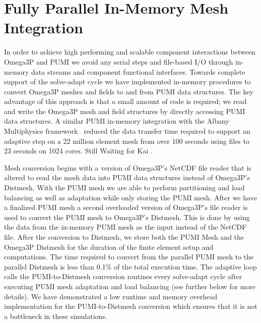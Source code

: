 \documentclass[review,12pt]{elsarticle_summary_report}
\begin{document}
\section{\label{in_memory}Fully Parallel In-Memory Mesh Integration}
In order to achieve high performing and scalable component interactions between
Omega3P and PUMI we avoid any serial steps and file-based I/O through in-memory data streams and component functional
interfaces. Towards complete support of the solve-adapt cycle we have implemented in-memory
procedures to convert Omega3P meshes and fields to and from  PUMI data structures.
The key advantage of this approach is that a small amount of code is 
required; we read and write the Omega3P mesh and field
structures by directly accessing PUMI data structures.
A similar PUMI in-memory integration with the Albany Multiphysics
framework~\cite{Albany2015,salinger2013albany} reduced the data transfer time
required to support an adaptive step on a 22 million element mesh from over 100
seconds using files to 23 seconds on 1024 cores. \color{red} Still Waiting for  Kai .\color{black} 

Mesh conversion begins with a version of Omega3P's NetCDF file reader that is altered
to read the mesh data into PUMI data structures instead of Omega3P's Distmesh. With 
the PUMI mesh we are able to perform partitioning and load balancing as well as adaptation 
while only storing the PUMI mesh. After we have a finalized PUMI mesh a second 
overloaded version of Omega3P's file reader is used to convert the PUMI mesh to 
Omega3P's Distmesh. This is done by using the data from the in-memory PUMI mesh as the 
input instead of the NetCDF file. After the conversion to Distmesh, we store both the
PUMI Mesh and the Omega3P Distmesh for the duration of the finite element setup and 
computations. The time required to convert from the parallel PUMI mesh to the
parallel Distmesh is less than 0.1\% of the total execution time.
The adaptive loop calls the PUMI-to-Distmesh conversion routines every
solve-adapt cycle after executing PUMI mesh adaptation and load balancing (see further below for more details).
We have demonstrated a low runtime and memory overhead implementation for the
PUMI-to-Distmesh conversion which ensures that it is not a bottleneck
in these simulations.
\end{document}
